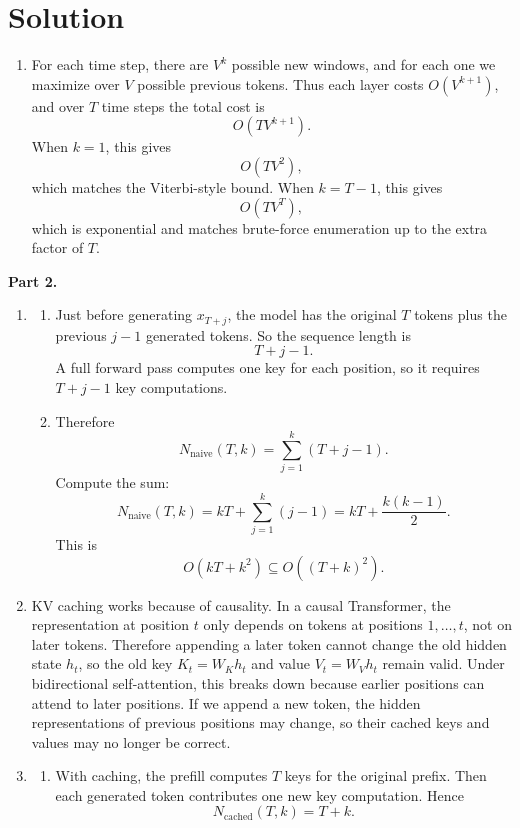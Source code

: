 \documentclass[submit]{harvardml}
\newenvironment{solution}
  {\color{blue}\section*{Solution}}
{}
\begin{document}
\begin{solution}
\begin{enumerate}
\begin{enumerate}
        \item[(iii)] For each time step, there are $V^k$ possible new windows, and for each one we maximize over $V$ possible previous tokens. Thus each layer costs $O(V^{k+1})$, and over $T$ time steps the total cost is
        \[
        O(TV^{k+1}).
        \]
        When $k=1$, this gives
        \[
        O(TV^2),
        \]
        which matches the Viterbi-style bound. When $k=T-1$, this gives
        \[
        O(TV^T),
        \]
        which is exponential and matches brute-force enumeration up to the extra factor of $T$.
    \end{enumerate}
\end{enumerate}

\textbf{Part 2.}

\begin{enumerate}
    \item[2a.]
    \begin{enumerate}
        \item[(i)] Just before generating $x_{T+j}$, the model has the original $T$ tokens plus the previous $j-1$ generated tokens. So the sequence length is
        \[
        T+j-1.
        \]
        A full forward pass computes one key for each position, so it requires $T+j-1$ key computations.

        \item[(ii)] Therefore
        \[
        N_{\text{naive}}(T,k)=\sum_{j=1}^k (T+j-1).
        \]
        Compute the sum:
        \[
        N_{\text{naive}}(T,k)=kT+\sum_{j=1}^k(j-1)
        =kT+\frac{k(k-1)}{2}.
        \]
        This is
        \[
        O(kT+k^2)\subseteq O((T+k)^2).
        \]
    \end{enumerate}

    \item[2b.] KV caching works because of causality. In a causal Transformer, the representation at position $t$ only depends on tokens at positions $1,\ldots,t$, not on later tokens. Therefore appending a later token cannot change the old hidden state $h_t$, so the old key $K_t=W_Kh_t$ and value $V_t=W_Vh_t$ remain valid. Under bidirectional self-attention, this breaks down because earlier positions can attend to later positions. If we append a new token, the hidden representations of previous positions may change, so their cached keys and values may no longer be correct.

    \item[2c.]
    \begin{enumerate}
        \item[(i)] With caching, the prefill computes $T$ keys for the original prefix. Then each generated token contributes one new key computation. Hence
        \[
        N_{\text{cached}}(T,k)=T+k.
        \]


\end{enumerate}
\end{enumerate}
\end{solution}
\end{document}
